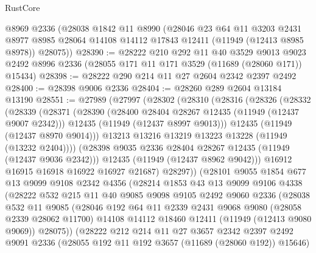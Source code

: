 \begin{lexlean}{RustCore}
\begin{coremodule}
    @8969
    @2336
    (@28038
      @1842
      @11
      @8990
      (@28046
        @23
        @64
        @11
        @3203
        @2431
        @8977
        @8985
        @28064
        @14108
        @14112
        @17843
        @12411
        (@11949 (@12413 @8985 @8978))
        @28075))
@28390 := @28222
    @210
    @292
    @11
    @40
    @3529
    @9013
    @9023
    @2492
    @8996
    @2336
    (@28055 @171 @11 @171 @3529 (@11689 (@28060 @171)) @15434)
@28398 := @28222 @290 @214 @11 @27 @2604 @2342 @2397 @2492
@28400 := @28398 @9006 @2336
@28404 := @28260 @289 @2604 @13184 @13190
@28551 := @27989
    (@27997
      (@28302
        (@28310
          (@28316
            (@28326
              (@28332
                (@28339
                  (@28371
                    (@28390
                      (@28400 @28404 @28267 @12435 (@11949 (@12437 @9007 @2342)))
                      @12435
                      (@11949 (@12437 @8997 @9013)))
                    @12435
                    (@11949 (@12437 @8970 @9014)))
                  @13213
                  @13216
                  @13219
                  @13223
                  @13228
                  (@11949 (@13232 @2404))))
              (@28398 @9035 @2336 @28404 @28267 @12435 (@11949 (@12437 @9036 @2342)))
              @12435
              (@11949 (@12437 @8962 @9042)))
            @16912
            @16915
            @16918
            @16922
            @16927
            @21687)
          @28297))
      (@28101
        @9055
        @1854
        @677
        @13
        @9099
        @9108
        @2342
        @4356
        (@28214
          @1853
          @43
          @13
          @9099
          @9106
          @4338
          (@28222
            @532
            @215
            @11
            @40
            @9085
            @9098
            @9105
            @2492
            @9060
            @2336
            (@28038
              @532
              @11
              @9085
              (@28046
                @192
                @64
                @11
                @2339
                @2431
                @9068
                @9080
                (@28058 @2339 @28062 @11700)
                @14108
                @14112
                @18460
                @12411
                (@11949 (@12413 @9080 @9069))
                @28075))
            (@28222
              @212
              @214
              @11
              @27
              @3657
              @2342
              @2397
              @2492
              @9091
              @2336
              (@28055 @192 @11 @192 @3657 (@11689 (@28060 @192)) @15646)

\end{coremodule}
\end{lexlean}

